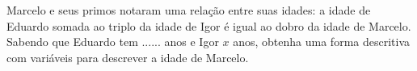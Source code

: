 \documentclass[a4paper,14pt]{article}
\begin{document}
\begin{multicols}{2}
\begin{enumerate}
\begin{center}
\begin{tcolorbox}[colback=white, colframe=black, boxrule=0.5mm, width=6cm]
    		\end{tcolorbox}
    		\end{center}
    		Marcelo e seus primos notaram uma relação entre suas idades: a idade de Eduardo somada ao triplo da idade de Igor é igual ao dobro da idade de Marcelo. Sabendo que Eduardo tem ...... anos e Igor $x$ anos, obtenha uma forma descritiva com variáveis para descrever a idade de Marcelo.
    	\end{enumerate}
    $~$ \\ $~$ \\ $~$ \\ $~$ \\ $~$ \\ $~$ \\ $~$ \\ $~$ \\ $~$ \\ $~$  \\ $~$  \\ $~$  \\ $~$  \\ $~$  \\ $~$  \\ $~$  \\ $~$  \\ $~$ \\ $~$
	\end{multicols}
\end{document}
